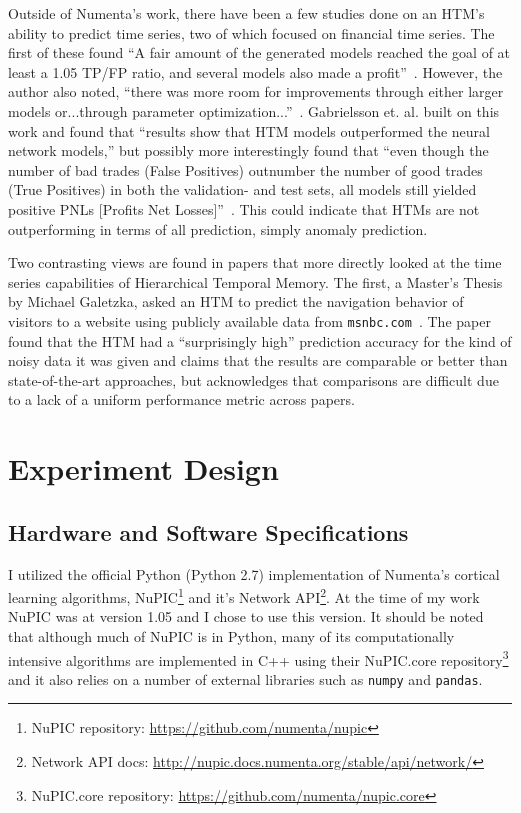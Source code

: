 \documentclass[oneside,12pt,openany]{book}
\begin{document}
	Outside of Numenta's work, there have been a few studies done on an HTM's ability to predict time series, two of which focused on financial time series. The first of these found ``A fair amount of the generated models reached the goal of at least a 1.05 TP/FP ratio, and several models also made a profit''~\cite{Evaluation}. However, the author also noted, ``there was more room for improvements through either larger models or...through parameter optimization...''~\cite{Evaluation}. Gabrielsson et. al. built on this work and found that ``results show that HTM models outperformed the neural network models,'' but possibly more interestingly found that ``even though the number of bad trades (False Positives) outnumber the number of good trades (True Positives) in both the validation- and test sets, all models still yielded positive PNLs [Profits Net Losses]''~\cite{EvolvingTrading}. This could indicate that HTMs are not outperforming in terms of all prediction, simply anomaly prediction.
	
	Two contrasting views are found in papers that more directly looked at the time series capabilities of Hierarchical Temporal Memory. The first, a Master's Thesis by Michael Galetzka, asked an HTM to predict the navigation behavior of visitors to a website using publicly available data from \texttt{msnbc.com}~\cite{Galetzka}. The paper found that the HTM had a ``surprisingly high'' prediction accuracy for the kind of noisy data it was given and claims that the results are comparable or better than state-of-the-art approaches, but acknowledges that comparisons are difficult due to a lack of a uniform performance metric across papers.
	
	\chapter{Experiment Design}
	
	\section{Hardware and Software Specifications}
	
	I utilized the official Python (Python 2.7) implementation of Numenta's cortical learning algorithms, NuPIC\footnote{NuPIC repository: \href{https://github.com/numenta/nupic}{\ttfamily https://github.com/numenta/nupic} } and it's Network API\footnote{Network API docs: \href{http://nupic.docs.numenta.org/stable/api/network/}{\ttfamily http://nupic.docs.numenta.org/stable/api/network/}}. At the time of my work NuPIC was at version 1.05 and I chose to use this version. It should be noted that although much of NuPIC is in Python, many of its computationally intensive algorithms are implemented in C++ using their NuPIC.core repository\footnote{NuPIC.core repository: \href{https://github.com/numenta/nupic.core}{\ttfamily https://github.com/numenta/nupic.core}} and it also relies on a number of external libraries such as \texttt{numpy} and \texttt{pandas}. 
	
\end{document}
